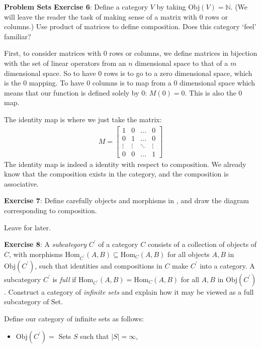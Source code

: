 \documentclass{report}
\begin{document}
\begin{exercises}{\textbf{Problem Sets}}
    \textbf{Exercise 6}: Define a category $V$ by taking $\text{Obj}(V) = \mathbb{N}$. (We will leave the reader the task of making sense of a matrix with 0 rows or columns.) Use product of matrices to define composition. Does this category `feel' familiar?
        \begin{answer}
            First, to consider matrices with 0 rows or columns, we define matrices in bijection with the set of linear operators from an $n$ dimensional space to that of a $m$ dimensional space. So to have $0$ rows is to go to a zero dimensional space, which is the $0$ mapping. To have 0 columns is to map from a $0$ dimensional space which means that our function is defined solely by 0: $M(0) = 0$. This is also the 0 map.

            The identity map is where we just take the matrix:
                \begin{align*}
                    M = 
                        \begin{bmatrix}
                            1      & 0      & \ldots & 0      \\
                            0      & 1      & \ldots & 0      \\
                            \vdots & \vdots & \ddots & \vdots \\
                            0      & 0      & \ldots & 1        
                        \end{bmatrix}
                \end{align*}
            The identity map is indeed a identity with respect to composition. We already know that the composition exists in the category, and the composition is associative.
        \end{answer}

    \textbf{Exercise 7}: Define carefully objects and morphisms in , and draw the diagram corresponding to composition.
        \begin{answer}
            Leave for later.
        \end{answer}

    \textbf{Exercise 8}: A \textit{subcategory} $C^{\prime}$ of a category $C$ consists of a collection of objects of $C$, with morphisms $\text{Hom}_{C^{\prime}}(A, B) \subseteq \text{Hom}_{C}(A, B)$ for all objects $A, B$ in $\text{Obj}(C^{\prime})$, such that identities and compositions in $C$ make $C^{\prime}$ into a category. A subcategory $C^{\prime}$ is \textit{full} if $\text{Hom}_{C^{\prime}}(A, B) = \text{Hom}_{C}(A, B)$ for all $A, B$ in $\text{Obj}(C^{\prime})$. Construct a category of \textit{infinite sets} and explain how it may be viewed as a full subcategory of $\text{Set}$.
        \begin{answer}
            Define our category of infinite sets as follows:
                \begin{itemize}
                    \item $\text{Obj}(C^{\prime}) = $ Sets $S$ such that $\lvert S \rvert = \infty$,


\end{itemize}
\end{answer}
\end{exercises}
\end{document}
